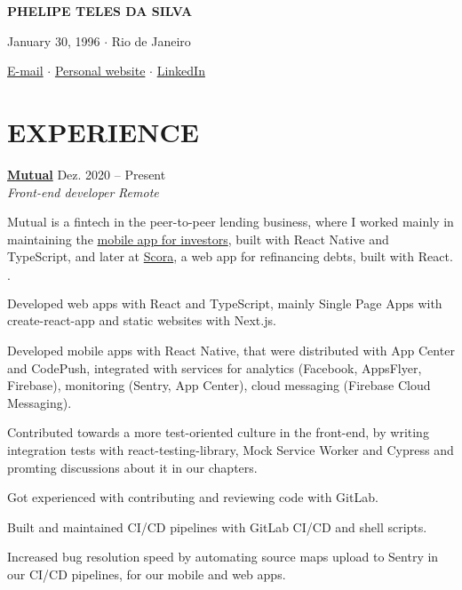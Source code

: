 \documentclass[12pt]{article}
\newenvironment{tightlist}
  {\begin{list}
    {$\cdot$}
    {
      \setlength{\leftmargin}{0em}
      \setlength{\itemsep}{\smallskipamount}
    }
  }
{\end{list}}
\begin{document}
\pagestyle{empty}

\centerline{\huge\bf PHELIPE TELES DA SILVA}
\medskip

\centerline{January 30, 1996 $\cdot$ Rio de Janeiro}
\smallskip

\centerline{
  \href{mailto:telesphelipe@gmail.com}{E-mail}
  $\cdot$
  \href{https://phelipetls.github.io}{Personal website}
  $\cdot$
  \href{https://linkedin.com/in/phelipeteles}{LinkedIn}
}
\smallskip

\section*{EXPERIENCE}

\textbf{\href{https://mutual.club}{Mutual}} \hfill Dez. 2020 -- Present \\
\textit{Front-end developer} \hfill \textit{Remote} {\parfillskip=0pt\par}

Mutual is a fintech in the peer-to-peer lending business, where I worked mainly
in maintaining the \href{https://mutual.club/en/invest.html}{mobile app for
investors}, built with React Native and TypeScript, and later at
\href{https://scora.com.br/}{Scora}, a web app for refinancing debts, built
with React.

\medskip

\begin{tightlist}
  \item Developed web apps with React and TypeScript, mainly Single Page Apps
    with create-react-app and static websites with Next.js.
  \item Developed mobile apps with React Native, that were distributed with App
    Center and CodePush, integrated with services for analytics (Facebook,
    AppsFlyer, Firebase), monitoring (Sentry, App Center), cloud messaging
    (Firebase Cloud Messaging).
  \item Contributed towards a more test-oriented culture in the front-end, by
    writing integration tests with react-testing-library, Mock Service Worker
    and Cypress and promting discussions about it in our chapters.
  \item Got experienced with contributing and reviewing code with GitLab.
  \item Built and maintained CI/CD pipelines with GitLab CI/CD and shell
    scripts.
  \item Increased bug resolution speed by automating source maps upload to
    Sentry in our CI/CD pipelines, for our mobile and web apps.
\end{tightlist}
\end{document}
